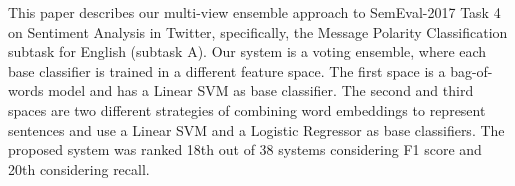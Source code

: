This paper describes our multi-view ensemble approach to SemEval-2017 Task 4 on Sentiment Analysis in Twitter, specifically, the Message Polarity Classification subtask for English (subtask A). Our system is a voting ensemble, where each base classifier is trained in a different feature space. The first space is a bag-of-words model and has a Linear SVM as base classifier. The second and third spaces are two different strategies of combining word embeddings to represent sentences and use a Linear SVM and a Logistic Regressor as base classifiers. The proposed system was ranked 18th out of 38 systems considering F1 score and 20th considering recall.
